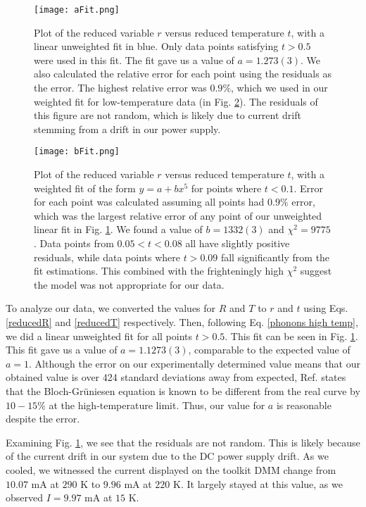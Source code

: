 \documentclass[11pt,letterpaper]{article}
\begin{document}
\begin{figure}
\centerline{\texttt{[image: aFit.png]}}
\caption{Plot of the reduced variable $r$ versus reduced temperature $t$, with a linear unweighted fit in blue. Only data points satisfying $t > 0.5$ were used in this fit. The fit gave us a value of $a = 1.273(3)$. We also calculated the relative error for each point using the residuals as the error. The highest relative error was $0.9\%$, which we used in our weighted fit for low-temperature data (in Fig. \ref{bFit}). The residuals of this figure are not random, which is likely due to current drift stemming from a drift in our power supply.} \label{aFit}
\end{figure}

\begin{figure}
\centerline{\texttt{[image: bFit.png]}}
\caption{Plot of the reduced variable $r$ versus reduced temperature $t$, with a weighted fit of the form $y = a + bx^5$ for points where $t < 0.1$. Error for each point was calculated assuming all points had $0.9\%$ error, which was the largest relative error of any point of our unweighted linear fit in Fig. \ref{aFit}. We found a value of $b = 1332(3)$ and $\chi^2 = 9775$. Data points from $0.05 < t < 0.08$ all have slightly positive residuals, while data points where $t > 0.09$ fall significantly from the fit estimations. This combined with the frighteningly high $\chi^2$ suggest the model was not appropriate for our data.} \label{bFit}
\end{figure}

To analyze our data, we converted the values for $R$ and $T$ to $r$ and $t$ using Eqs. \ref{reducedR} and \ref{reducedT} respectively. Then, following Eq. \ref{phonons high temp}, we did a linear unweighted fit for all points $t > 0.5$. This fit can be seen in Fig. \ref{aFit}. This fit gave us a value of $a = 1.1273(3)$, comparable to the expected value of $a = 1$. Although the error on our experimentally determined value means that our obtained value is over 424 standard deviations away from expected, Ref. \cite{Thomas} states that the Bloch-Grüniesen equation is known to be different from the real curve by $10-15\%$ at the high-temperature limit. Thus, our value for $a$ is reasonable despite the error.

Examining Fig. \ref{aFit}, we see that the residuals are not random. This is likely because of the current drift in our system due to the DC power supply drift. As we cooled, we witnessed the current displayed on the toolkit DMM change from $10.07$ mA at $290$ K to $9.96$ mA at $220$ K. It largely stayed at this value, as we observed $I = 9.97$ mA at $15$ K.
\end{document}
